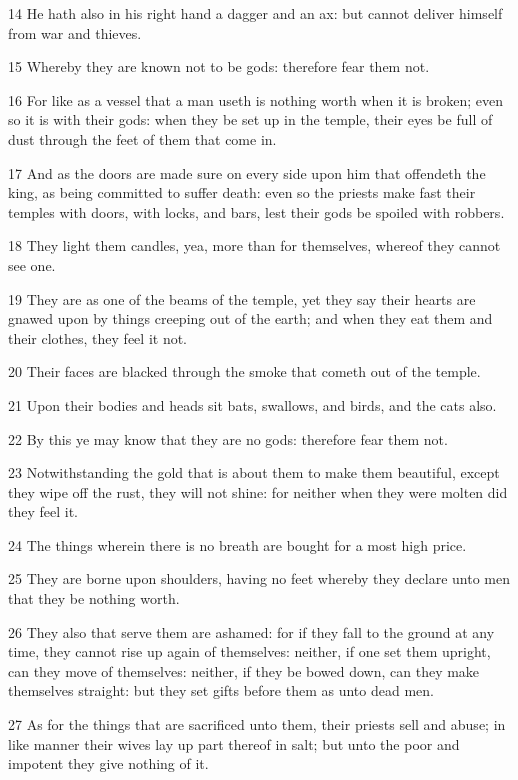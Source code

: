 \par 14 He hath also in his right hand a dagger and an ax: but cannot deliver himself from war and thieves.
\par 15 Whereby they are known not to be gods: therefore fear them not.
\par 16 For like as a vessel that a man useth is nothing worth when it is broken; even so it is with their gods: when they be set up in the temple, their eyes be full of dust through the feet of them that come in.
\par 17 And as the doors are made sure on every side upon him that offendeth the king, as being committed to suffer death: even so the priests make fast their temples with doors, with locks, and bars, lest their gods be spoiled with robbers.
\par 18 They light them candles, yea, more than for themselves, whereof they cannot see one.
\par 19 They are as one of the beams of the temple, yet they say their hearts are gnawed upon by things creeping out of the earth; and when they eat them and their clothes, they feel it not.
\par 20 Their faces are blacked through the smoke that cometh out of the temple.
\par 21 Upon their bodies and heads sit bats, swallows, and birds, and the cats also.
\par 22 By this ye may know that they are no gods: therefore fear them not.
\par 23 Notwithstanding the gold that is about them to make them beautiful, except they wipe off the rust, they will not shine: for neither when they were molten did they feel it.
\par 24 The things wherein there is no breath are bought for a most high price.
\par 25 They are borne upon shoulders, having no feet whereby they declare unto men that they be nothing worth.
\par 26 They also that serve them are ashamed: for if they fall to the ground at any time, they cannot rise up again of themselves: neither, if one set them upright, can they move of themselves: neither, if they be bowed down, can they make themselves straight: but they set gifts before them as unto dead men.
\par 27 As for the things that are sacrificed unto them, their priests sell and abuse; in like manner their wives lay up part thereof in salt; but unto the poor and impotent they give nothing of it.
